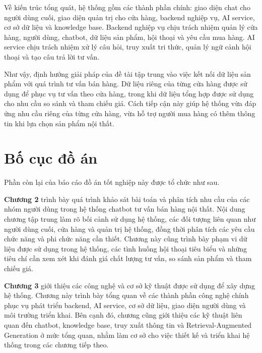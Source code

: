 \documentclass[../DoAn.tex]{subfiles}
\begin{document}
Về kiến trúc tổng quát, hệ thống gồm các thành phần chính: giao diện chat cho người dùng cuối, giao diện quản trị cho cửa hàng, backend nghiệp vụ, AI service, cơ sở dữ liệu và knowledge base. Backend nghiệp vụ chịu trách nhiệm quản lý cửa hàng, người dùng, chatbot, dữ liệu sản phẩm, hội thoại và yêu cầu mua hàng. AI service chịu trách nhiệm xử lý câu hỏi, truy xuất tri thức, quản lý ngữ cảnh hội thoại và tạo câu trả lời tư vấn.

Như vậy, định hướng giải pháp của đề tài tập trung vào việc kết nối dữ liệu sản phẩm với quá trình tư vấn bán hàng. Dữ liệu riêng của từng cửa hàng được sử dụng để phục vụ tư vấn theo cửa hàng, trong khi dữ liệu tổng hợp được sử dụng cho nhu cầu so sánh và tham chiếu giá. Cách tiếp cận này giúp hệ thống vừa đáp ứng nhu cầu riêng của từng cửa hàng, vừa hỗ trợ người mua hàng có thêm thông tin khi lựa chọn sản phẩm nội thất.


\section{Bố cục đồ án}
\label{section:1.4}
Phần còn lại của báo cáo đồ án tốt nghiệp này được tổ chức như sau.

\textbf{Chương 2} trình bày quá trình khảo sát bài toán và phân tích nhu cầu của các nhóm người dùng trong hệ thống chatbot tư vấn bán hàng nội thất. Nội dung chương tập trung làm rõ bối cảnh sử dụng hệ thống, các đối tượng liên quan như người dùng cuối, cửa hàng và quản trị hệ thống, đồng thời phân tích các yêu cầu chức năng và phi chức năng cần thiết. Chương này cũng trình bày phạm vi dữ liệu được sử dụng trong hệ thống, các tình huống hội thoại tiêu biểu và những tiêu chí cần xem xét khi đánh giá chất lượng tư vấn, so sánh sản phẩm và tham chiếu giá.

\textbf{Chương 3} giới thiệu các công nghệ và cơ sở kỹ thuật được sử dụng để xây dựng hệ thống. Chương này trình bày tổng quan về các thành phần công nghệ chính phục vụ phát triển backend, AI service, cơ sở dữ liệu, giao diện người dùng và môi trường triển khai. Bên cạnh đó, chương cũng giới thiệu các kỹ thuật liên quan đến chatbot, knowledge base, truy xuất thông tin và Retrieval-Augmented Generation ở mức tổng quan, nhằm làm cơ sở cho việc thiết kế và triển khai hệ thống trong các chương tiếp theo.
\end{document}
